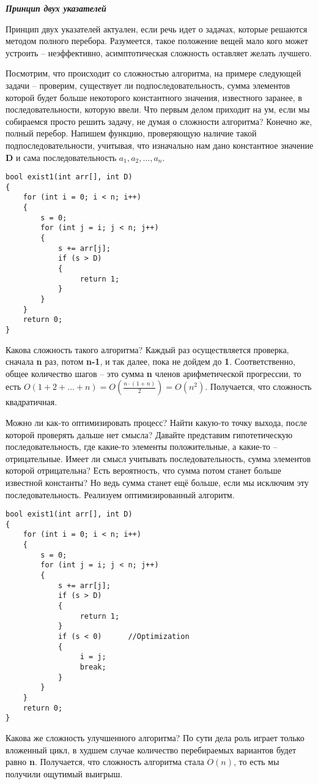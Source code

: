 \documentclass [a4paper,12pt] {report} 		%
\begin{document}
\begin{center}
{\Large \bfseries \slshape Принцип двух указателей}
\end{center}

Принцип двух указателей актуален, если речь идет о задачах, которые решаются методом полного перебора. Разумеется, такое положение вещей мало кого может устроить – неэффективно, асимптотическая сложность оставляет желать лучшего. 

Посмотрим, что происходит со сложностью алгоритма, на примере следующей задачи – проверим, существует ли подпоследовательность, сумма элементов которой будет больше некоторого константного значения, известного заранее, в последовательности, которую ввели. Что первым делом приходит на ум, если мы собираемся просто решить задачу, не думая о сложности алгоритма? Конечно же, полный перебор. Напишем функцию, проверяющую наличие такой подпоследовательности, учитывая, что изначально нам дано константное значение {\bfseries  D} и сама последовательность {\bfseries  $a_{1}, a_{2}, … , a_{n}$}.

\lstset {language = C++, frame = single}
\begin{lstlisting}
bool exist1(int arr[], int D)
{
    for (int i = 0; i < n; i++)
    {
        s = 0;
        for (int j = i; j < n; j++)
        {
            s += arr[j];
            if (s > D)
            {
                 return 1;
            }
        }
    }
	return 0;
}
\end{lstlisting}

Какова сложность такого алгоритма? Каждый раз осуществляется проверка, сначала {\bfseries n} раз, потом {\bfseries n-1}, и так далее, пока не дойдем до {\bfseries 1}. Соответственно, общее количество шагов – это сумма {\bfseries n} членов арифметической прогрессии, то есть $O(1 + 2 + … + n) = O(\frac {n \cdot (1+n)} {2}) = O(n^2)$. Получается, что сложность квадратичная.

Можно ли как-то оптимизировать процесс? Найти какую-то точку выхода, после которой проверять дальше нет смысла? Давайте представим гипотетическую последовательность, где какие-то элементы положительные, а какие-то – отрицательные. Имеет ли смысл учитывать последовательность, сумма элементов которой отрицательна? Есть вероятность, что сумма потом станет больше известной константы? Но ведь сумма станет ещё больше, если мы исключим эту последовательность. Реализуем оптимизированный алгоритм.

\begin{lstlisting}
bool exist1(int arr[], int D)
{
    for (int i = 0; i < n; i++)
    {
        s = 0;
        for (int j = i; j < n; j++)
        {
            s += arr[j];
            if (s > D)
            {
                 return 1;
            }
            if (s < 0)		//Optimization
            {
                 i = j;
                 break;
            }
        }
    }
	return 0;
}
\end{lstlisting}

Какова же сложность улучшенного алгоритма? По сути дела роль играет только вложенный цикл, в худшем случае количество перебираемых вариантов будет равно {\bfseries n}. Получается, что сложность алгоритма стала $O(n)$, то есть мы получили ощутимый выигрыш.
\end{document}
